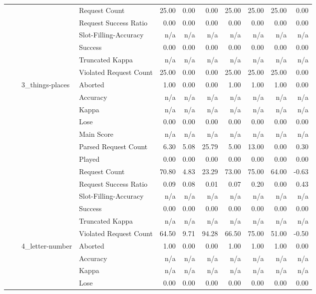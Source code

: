 \begin{tabular}{llllrrrrrrr}
 &  &  & Request Count & 25.00 & 0.00 & 0.00 & 25.00 & 25.00 & 25.00 & 0.00 \\
 &  &  & Request Success Ratio & 0.00 & 0.00 & 0.00 & 0.00 & 0.00 & 0.00 & 0.00 \\
 &  &  & Slot-Filling-Accuracy & n/a & n/a & n/a & n/a & n/a & n/a & n/a \\
 &  &  & Success & 0.00 & 0.00 & 0.00 & 0.00 & 0.00 & 0.00 & 0.00 \\
 &  &  & Truncated Kappa & n/a & n/a & n/a & n/a & n/a & n/a & n/a \\
 &  &  & Violated Request Count & 25.00 & 0.00 & 0.00 & 25.00 & 25.00 & 25.00 & 0.00 \\
\cline{3-11}
 &  & \multirow[t]{13}{*}{3_things-places} & Aborted & 1.00 & 0.00 & 0.00 & 1.00 & 1.00 & 1.00 & 0.00 \\
 &  &  & Accuracy & n/a & n/a & n/a & n/a & n/a & n/a & n/a \\
 &  &  & Kappa & n/a & n/a & n/a & n/a & n/a & n/a & n/a \\
 &  &  & Lose & 0.00 & 0.00 & 0.00 & 0.00 & 0.00 & 0.00 & 0.00 \\
 &  &  & Main Score & n/a & n/a & n/a & n/a & n/a & n/a & n/a \\
 &  &  & Parsed Request Count & 6.30 & 5.08 & 25.79 & 5.00 & 13.00 & 0.00 & 0.30 \\
 &  &  & Played & 0.00 & 0.00 & 0.00 & 0.00 & 0.00 & 0.00 & 0.00 \\
 &  &  & Request Count & 70.80 & 4.83 & 23.29 & 73.00 & 75.00 & 64.00 & -0.63 \\
 &  &  & Request Success Ratio & 0.09 & 0.08 & 0.01 & 0.07 & 0.20 & 0.00 & 0.43 \\
 &  &  & Slot-Filling-Accuracy & n/a & n/a & n/a & n/a & n/a & n/a & n/a \\
 &  &  & Success & 0.00 & 0.00 & 0.00 & 0.00 & 0.00 & 0.00 & 0.00 \\
 &  &  & Truncated Kappa & n/a & n/a & n/a & n/a & n/a & n/a & n/a \\
 &  &  & Violated Request Count & 64.50 & 9.71 & 94.28 & 66.50 & 75.00 & 51.00 & -0.50 \\
\cline{3-11}
 &  & \multirow[t]{13}{*}{4_letter-number} & Aborted & 1.00 & 0.00 & 0.00 & 1.00 & 1.00 & 1.00 & 0.00 \\
 &  &  & Accuracy & n/a & n/a & n/a & n/a & n/a & n/a & n/a \\
 &  &  & Kappa & n/a & n/a & n/a & n/a & n/a & n/a & n/a \\
 &  &  & Lose & 0.00 & 0.00 & 0.00 & 0.00 & 0.00 & 0.00 & 0.00 \\

\end{tabular}
